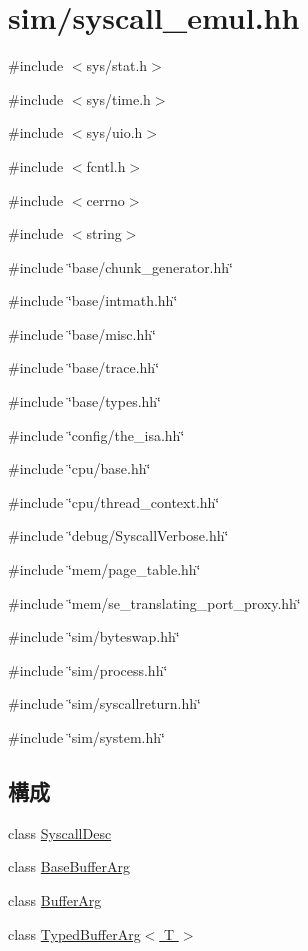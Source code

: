 \hypertarget{syscall__emul_8hh}{
\section{sim/syscall\_\-emul.hh}
\label{syscall__emul_8hh}
}
{\ttfamily \#include $<$sys/stat.h$>$}\par
{\ttfamily \#include $<$sys/time.h$>$}\par
{\ttfamily \#include $<$sys/uio.h$>$}\par
{\ttfamily \#include $<$fcntl.h$>$}\par
{\ttfamily \#include $<$cerrno$>$}\par
{\ttfamily \#include $<$string$>$}\par
{\ttfamily \#include \char`\"{}base/chunk\_\-generator.hh\char`\"{}}\par
{\ttfamily \#include \char`\"{}base/intmath.hh\char`\"{}}\par
{\ttfamily \#include \char`\"{}base/misc.hh\char`\"{}}\par
{\ttfamily \#include \char`\"{}base/trace.hh\char`\"{}}\par
{\ttfamily \#include \char`\"{}base/types.hh\char`\"{}}\par
{\ttfamily \#include \char`\"{}config/the\_\-isa.hh\char`\"{}}\par
{\ttfamily \#include \char`\"{}cpu/base.hh\char`\"{}}\par
{\ttfamily \#include \char`\"{}cpu/thread\_\-context.hh\char`\"{}}\par
{\ttfamily \#include \char`\"{}debug/SyscallVerbose.hh\char`\"{}}\par
{\ttfamily \#include \char`\"{}mem/page\_\-table.hh\char`\"{}}\par
{\ttfamily \#include \char`\"{}mem/se\_\-translating\_\-port\_\-proxy.hh\char`\"{}}\par
{\ttfamily \#include \char`\"{}sim/byteswap.hh\char`\"{}}\par
{\ttfamily \#include \char`\"{}sim/process.hh\char`\"{}}\par
{\ttfamily \#include \char`\"{}sim/syscallreturn.hh\char`\"{}}\par
{\ttfamily \#include \char`\"{}sim/system.hh\char`\"{}}\par
\subsection*{構成}
\begin{DoxyCompactItemize}
\item 
class \hyperlink{classSyscallDesc}{SyscallDesc}
\item 
class \hyperlink{classBaseBufferArg}{BaseBufferArg}
\item 
class \hyperlink{classBufferArg}{BufferArg}
\item 
class \hyperlink{classTypedBufferArg}{TypedBufferArg$<$ T $>$}
\end{DoxyCompactItemize}
